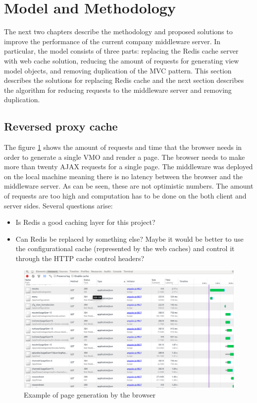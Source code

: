 \section{Model and Methodology}

The next two chapters describe the methodology and proposed solutions to improve the performance of the current company middleware server. In particular, the model consists of three parts: replacing the Redis cache server with web cache solution, reducing the amount of requests for generating view model objects, and removing duplication of the MVC pattern. This section describes the solutions for replacing Redis cache and the next section describes the algorithm for reducing requests to the middleware server and removing duplication.

\subsection{Reversed proxy cache}

The figure \ref{fig:req_amount} shows the amount of requests and time that the browser needs in order to generate a single VMO and render a page. The browser needs to make more than twenty AJAX requests for a single page. The middleware was deployed on the local machine meaning there is no latency between the browser and the middleware server. As can be seen, these are not optimistic numbers. The amount of requests are too high and computation has to be done on the both client and server sides. Several questions arise:

\begin{itemize}
	\item Is Redis a good caching layer for this project?
	\item Can Redis be replaced by something else? Maybe it would be better to use the configurational cache (represented by the web caches) and control it through the HTTP cache control headers?
\end{itemize}


\begin{figure}[h]
    \centering
	\includegraphics[width=\textwidth]{images/amount_of_requests.png}
    \caption{Example of page generation by the browser}
    \label{fig:req_amount}
\end{figure}

